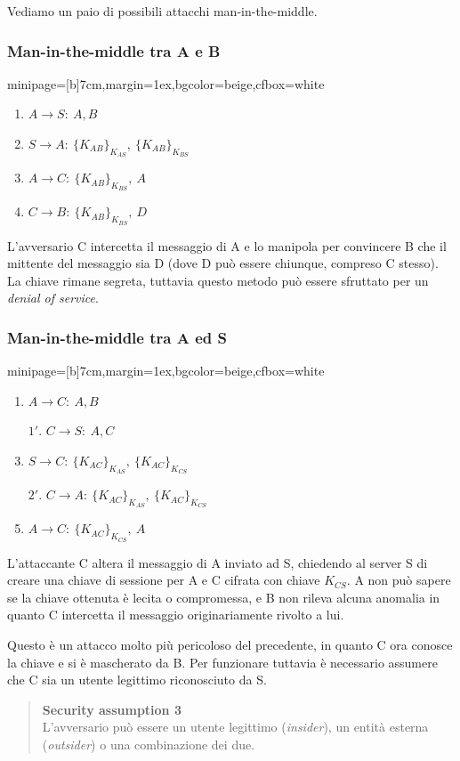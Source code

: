 \documentclass[a4paper, 11pt, twoside, openright, fleqn]{report}
\newcommand{\fromto}[2]{#1\rightarrow #2\!:\ }
\newenvironment{colbox}[2]%
{%
	\par\noindent\hspace{10pt}
	\begin{adjustbox}{minipage=[b]{#2},margin=1ex,bgcolor=#1,cfbox=white}
}{%
	\end{adjustbox}\newline%
}
\begin{document}
\noindent Vediamo un paio di possibili attacchi man-in-the-middle.
\subsubsection{Man-in-the-middle tra A e B}
\begin{colbox}{beige}{7cm}
	\begin{enumerate}
		\item $\fromto{A}{S}A, B$
		\item $\fromto{S}{A}\{K_{AB}\}_{K_{AS}},\ \{K_{AB}\}_{K_{BS}}$
		\item $\fromto{A}{C}\{K_{AB}\}_{K_{BS}},\ A$
		\item $\fromto{C}{B}\{K_{AB}\}_{K_{BS}},\ D$
	\end{enumerate}
\end{colbox}
L'avversario C intercetta il messaggio di A e lo manipola per convincere B che il mittente del messaggio sia D (dove D può essere chiunque, compreso C stesso). La chiave rimane segreta, tuttavia questo metodo può essere sfruttato per un \emph{denial of service}.

\subsubsection{Man-in-the-middle tra A ed S}
\begin{colbox}{beige}{7cm}
	\begin{enumerate}
		\item $\fromto{A}{C}A, B$
		\item[$1'$.] $\fromto{C}{S}A, C$
		\item $\fromto{S}{C}\{K_{AC}\}_{K_{AS}},\ \{K_{AC}\}_{K_{CS}}$
		\item[$2'$.] $\fromto{C}{A}\{K_{AC}\}_{K_{AS}},\ \{K_{AC}\}_{K_{CS}}$
		\item $\fromto{A}{C}\{K_{AC}\}_{K_{CS}},\ A$
	\end{enumerate}
\end{colbox}
L'attaccante C altera il messaggio di A inviato ad S, chiedendo al server S di creare una chiave di sessione per A e C cifrata con chiave $K_{CS}$. A non può sapere se la chiave ottenuta è lecita o compromessa, e B non rileva alcuna anomalia in quanto C intercetta il messaggio originariamente rivolto a lui.

Questo è un attacco molto più pericoloso del precedente, in quanto C ora conosce la chiave e si è mascherato da B. Per funzionare tuttavia è necessario assumere che C sia un utente legittimo riconosciuto da S.
\begin{quote}
	\textbf{Security assumption 3}\\
	L'avversario può essere un utente legittimo (\emph{insider}), un entità esterna (\emph{outsider}) o una combinazione dei due.
\end{quote}
\end{document}
